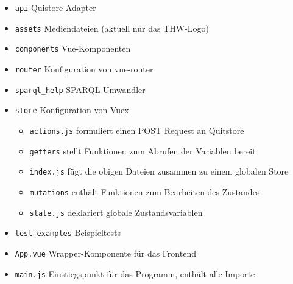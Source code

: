 \documentclass[a4paper,11pt,oneside, titlepage]{article}
\begin{document}
  \newpage


    \begin{itemize}
      \item \verb+api+ Quistore-Adapter
      \item \verb+assets+ Mediendateien (aktuell nur das THW-Logo)
      \item \verb+components+ Vue-Komponenten
      \item \verb+router+ Konfiguration von vue-router
      \item \verb+sparql_help+ SPARQL Umwandler
      \item \verb+store+ Konfiguration von Vuex
        \begin{itemize}
          \item \verb+actions.js+ formuliert einen POST Request an Quitstore
          \item \verb+getters+ stellt Funktionen zum Abrufen der Variablen bereit
          \item \verb+index.js+ fügt die obigen Dateien zusammen zu einem globalen Store
          \item \verb+mutations+ enthält Funktionen zum Bearbeiten des Zustandes
          \item \verb+state.js+ deklariert globale Zustandsvariablen
        \end{itemize}
      \item \verb+test-examples+ Beispieltests
      \item \verb+App.vue+ Wrapper-Komponente für das Frontend
      \item \verb+main.js+ Einstiegspunkt für das Programm, enthält alle Importe
    \end{itemize}

\begin{minipage}{16cm}
\end{minipage}

  \newpage
\end{document}
